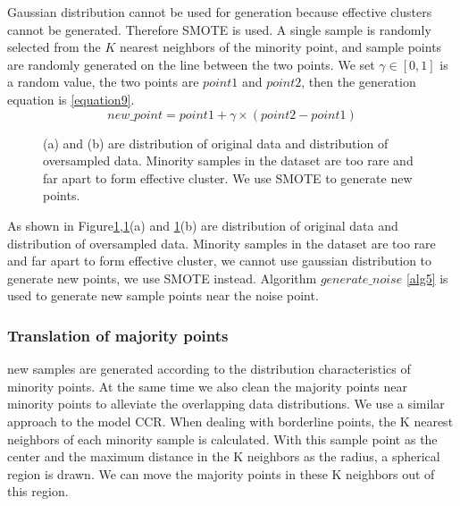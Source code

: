 \documentclass[runningheads]{llncs}
\begin{document}
Gaussian distribution cannot be used for generation because effective clusters cannot be generated. 
Therefore SMOTE is used.
A single sample is randomly selected from the $K$ nearest neighbors of the minority point, 
 and sample points are randomly generated on the line between the two points.
 We set $\gamma \in [0,1]$ is a random value, the two points are $point1$ and $point2$,
 then the generation equation is \ref{equation9}.
 \begin{equation}
  \label{equation9}
  new\_point=point1+\gamma \times (point2-point1)
\end{equation}

\begin{figure}[htbp]
  \centering
  \quad
  \caption{(a) and (b) are distribution of original data and distribution of oversampled data.
  Minority samples in the dataset are too rare and far apart to form effective cluster. 
  We use SMOTE to generate new points.}
  \label{fig14}
  \end{figure}

As shown in Figure\ref{fig14},\ref{fig14}(a) and \ref{fig14}(b) are distribution of original data and distribution
 of oversampled data.
Minority samples in the dataset are too rare and far apart to form effective cluster, we cannot use
gaussian distribution to generate new points, we use SMOTE instead.
Algorithm $generate\_noise$ \ref{alg5} is used to generate new sample points near the noise point.

\subsubsection{Translation of majority points}
new samples are generated according to the distribution characteristics of minority points. 
At the same time we also clean the majority points near minority
points to alleviate the overlapping data distributions.
We use a similar approach to the model CCR\cite{2017CCR}.
When dealing with borderline points, 
the K nearest neighbors of each minority sample is calculated. 
With this sample point as the center and the maximum distance in the K neighbors as the radius, 
a spherical region is drawn. We can move the majority points in these K neighbors out of this region.
\end{document}

